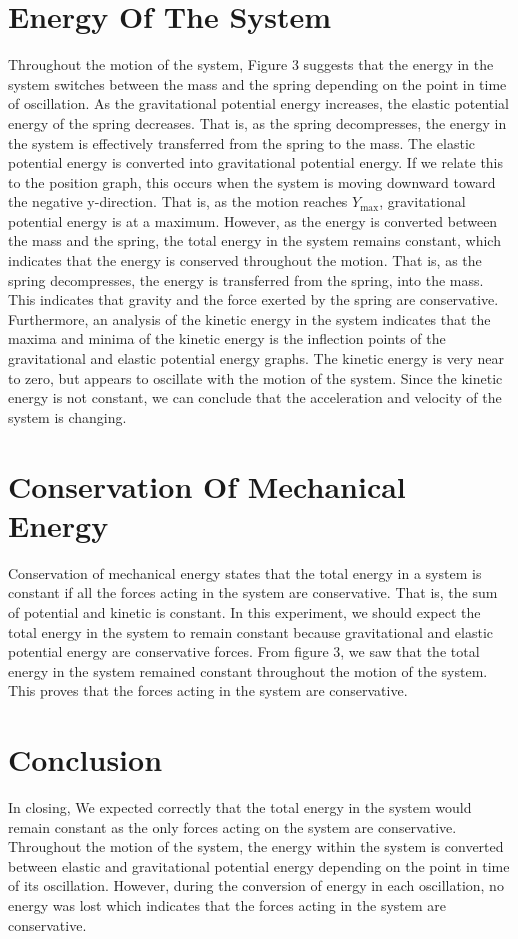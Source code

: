 \documentclass[12pt]{article}
\begin{document}
\section{Energy Of The System}
Throughout the motion of the system, Figure 3 suggests that the energy in the system switches between the mass and the spring depending on the point in time of oscillation. As the gravitational potential energy increases, the elastic potential energy of the spring decreases. That is, as the spring decompresses, the energy in the system is effectively transferred from the spring to the mass. The elastic potential energy is converted into gravitational potential energy. If we relate this to the position graph, this occurs when the system is moving downward toward the negative y-direction. That is, as the motion reaches $Y_\text{max}$, gravitational potential energy is at a maximum. However, as the energy is converted between the mass and the spring, the total energy in the system remains constant, which indicates that the energy is conserved throughout the motion. That is, as the spring decompresses, the energy is transferred from the spring, into the mass. This indicates that gravity and the force exerted by the spring are conservative. Furthermore, an analysis of the kinetic energy in the system indicates that the maxima and minima of the kinetic energy is the inflection points of the gravitational and elastic potential energy graphs. The kinetic energy is very near to zero, but appears to oscillate with the motion of the system. Since the kinetic energy is not constant, we can conclude that the acceleration and velocity of the system is changing.
\section{Conservation Of Mechanical Energy}
Conservation of mechanical energy states that the total energy in a system is constant if all the forces acting in the system are conservative. That is, the sum of potential and kinetic is constant. In this experiment, we should expect the total energy in the system to remain constant because gravitational and elastic potential energy are conservative forces. From figure 3, we saw that the total energy in the system remained constant throughout the motion of the system. This proves that the forces acting in the system are conservative.
\section{Conclusion}
In closing, We expected correctly that the total energy in the system would remain constant as the only forces acting on the system are conservative. Throughout the motion of the system, the energy within the system is converted between elastic and gravitational potential energy depending on the point in time of its oscillation. However, during the conversion of energy in each oscillation, no energy was lost which indicates that the forces acting in the system are conservative.
\end{document}
